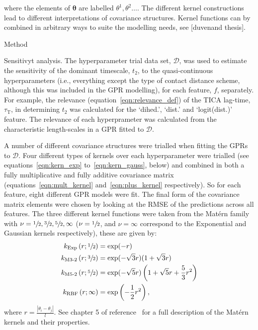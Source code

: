 where the elements of $\bm{\theta}$ are labelled $\theta^{1}, \theta^{2} \ldots$. The different kernel constructions lead to different interpretations of covariance structures.  Kernel functions can by combined in arbitrary ways to suite the modelling needs, see [duvenand thesis]. 

Method

Sensitivyt analysis. 
The hyperparameter trial data set, $\mathcal{D}$, was used to estimate the sensitivity of the dominant timescale, $t_2$, to the quasi-continuous hyperparameters (i.e., everything except the type of contact distance scheme, although this was included in the GPR modelling), for each feature, $f$, separately. For example, the relevance (equation~\ref{eqn:relevance_def}) of the TICA lag-time, $\tau_{\mathrm{T}}$, in determining $t_2$ was calculated for the `dihed.', `dist.' and `logit(dist.)' feature.  The relevance of each hyperprameter was calculated from the characteristic length-scales in a GPR fitted to $\mathcal{D}$.  

A number of different covariance structures were trialled when fitting the GPRs to $\mathcal{D}$. Four different types of kernels over each hyperparameter were trialled (see equations~\ref{eqn:kern_exp} to~\ref{eqn:kern_gauss}, below) and combined in both a fully multiplicative and fully additive covariance matrix (equations~\ref{eqn:mult_kernel} and~\ref{eqn:plus_kernel} respectively).  So for each feature, eight different GPR models were fit. The final form of the covariance matrix elements were chosen by looking at the RMSE of the predictions across all features. The three different kernel functions were taken from the Mat\'ern family with $\nu=\sfrac{1}{2}, \sfrac{3}{2}, \sfrac{5}{2}, \infty$ ($\nu=\sfrac{1}{2}$, and $\nu=\infty$ correspond to the Exponential and Gaussian kernels respectively), these are given by: 
\begin{align}
k_{\text{Exp}}\left(r; \sfrac{1}{2}\right) &=\exp (-r) \label{eqn:kern_exp}\\
k_{\text{M3-2}}\left(r; \sfrac{3}{2}\right) &= \exp (-\sqrt{3} r)(1+\sqrt{3} r) \label{eqn:kern_m32} \\
k_{\text{M5-2}}\left(r; \sfrac{5}{2}\right) &= \exp (-\sqrt{5} r)\left(1+\sqrt{5} r+\frac{5}{3} r^{2}\right) \label{eqn:kern_m52}\\
k_{\text{RBF}}\left(r; \infty\right) &= \exp \left(-\frac{1}{2} r^{2}\right), \label{eqn:kern_gauss}
\end{align}
where $r = \frac{|\theta_i-\theta_j|}{l}$. See chapter 5 of  reference~\cite{rasmussenGaussianProcessesMachine2006} for a full description of the Mat\'{e}rn kernels and their properties.  

